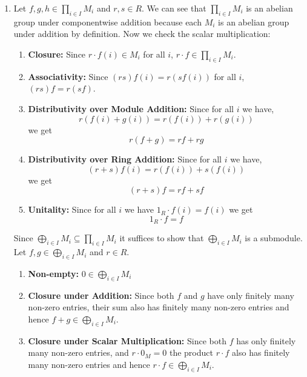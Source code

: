 \documentclass[Notebook.tex]{subfiles}
\begin{document}
    \begin{solution}
        \bbni
        \begin{enumerate}
            \item Let $f, g, h \in \prod_{i \in I} M_i$ and $r, s \in R$. We can see that $\prod_{i \in I} M_i$ is an abelian group under componentwise addition because each $M_i$ is an abelian group under addition by definition. Now we check the scalar multiplication: 
            \begin{enumerate}
                \item \textbf{Closure:} Since $r \cdot f(i) \in M_i$ for all $i$, $r \cdot f \in \prod_{i \in I} M_i$. 
                \item \textbf{Associativity: } Since $(rs) f(i) = r(s f(i))$ for all $i$, $(rs)f  = r(sf)$. 
                \item \textbf{Distributivity over Module Addition:} Since for all $i$ we have, \[r(f(i) + g(i)) = r(f(i)) + r(g(i))\] we get 
                \[r(f + g) = rf + rg\]
                \item  \textbf{Distributivity over Ring Addition:} Since for all $i$ we have, \[(r+s)f(i) = r(f(i)) + s(f(i))\] we get 
                \[(r+s)f = rf + sf\]
                \item \textbf{Unitality:} Since for all $i$ we have $1_R \cdot f(i) = f(i)$ we get 
                \[1_R \cdot f = f\]
            \end{enumerate}
             
            Since $\bigoplus_{i \in I} M_i \subseteq \prod_{i \in I} M_i$ it suffices to show that $\bigoplus_{i \in I} M_i$ is a submodule. Let $f, g \in \bigoplus_{i \in I} M_i$ and $r \in R$.

            \begin{enumerate}
                \item \textbf{Non-empty:} $0 \in \bigoplus_{i \in I} M_i$
                \item \textbf{Closure under Addition: } Since both $f$ and $g$ have only finitely many non-zero entries, their sum also has finitely many non-zero entries and hence $f + g \in \bigoplus_{i \in I} M_i$. 
                \item \textbf{Closure under Scalar Multiplication:} Since both $f$ has only finitely many non-zero entries, and $ r \cdot 0_M  = 0$ the product $r \cdot f$ also has finitely many non-zero entries and hence $r \cdot f \in \bigoplus_{i \in I} M_i$. 
            \end{enumerate}


\end{enumerate}
\end{solution}
\end{document}
